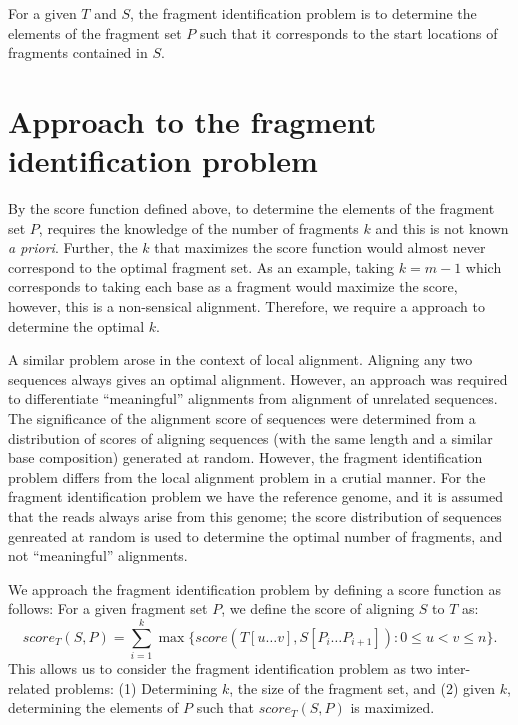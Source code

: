 For a given $T$ and $S$, the fragment identification problem is to
determine the elements of the fragment set $P$ such that it corresponds
to the start locations of fragments contained in $S$.



\section{Approach to the fragment identification problem}
By the score function defined above, to determine the elements of the
fragment set $P$, requires the knowledge of the number of fragments $k$
and this is not known \textit{a priori}. Further, the $k$ that maximizes
the score function would almost never correspond to the optimal fragment
set. As an example, taking $k=m-1$ which corresponds to taking each base
as a fragment would maximize the score, however, this is a non-sensical
alignment.
Therefore, we require a approach to determine the optimal $k$.

A similar problem arose in the context of local alignment. Aligning any
two sequences always gives an optimal alignment. However, an approach
was required to differentiate ``meaningful'' alignments from alignment
of unrelated sequences.
The significance of the alignment score of sequences were determined
from a distribution of scores of aligning sequences (with the same
length and a similar base composition) generated at random.
However, the fragment identification problem differs from the local
alignment problem in a crutial manner. For the fragment identification
problem we have the reference genome, and it is assumed that the reads
always arise from this genome; the score distribution of sequences
genreated at random is used to determine the optimal number of
fragments, and not ``meaningful'' alignments.

We approach the fragment identification problem by defining a score
function as follows:
For a given fragment set $P$, we define the score of aligning $S$ to $T$
as: \[score_T(S,P) = \sum_{i=1}^{k} \max\{score(T[u \dots v], S[P_i
\dots P_{i+1}]): 0 \leq u < v \leq n\}.\] This allows us to
consider the fragment identification problem as two inter-related
problems: (1) Determining $k$, the size of the fragment set, and (2)
given $k$, determining the elements of $P$ such that $score_T(S, P)$ is
maximized.

